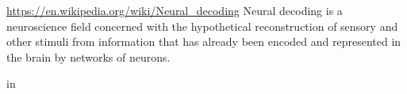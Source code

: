 \documentclass[a4paper]{standalone}
\begin{document}
    \url{https://en.wikipedia.org/wiki/Neural_decoding}
    Neural decoding is a neuroscience field concerned with the hypothetical reconstruction of sensory and other stimuli from information that has already been encoded and represented in the brain by networks of neurons.
    
    in
\end{document}
